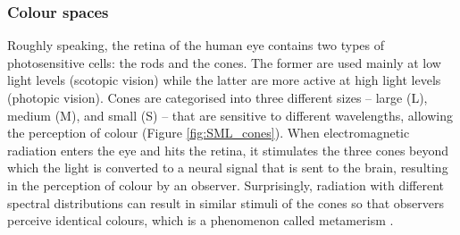 \subsubsection{Colour spaces}

Roughly speaking, the retina of the human eye contains two types of photosensitive cells: the rods and the cones. The former are used mainly at low light levels (scotopic vision) while the latter are more active at high light levels (photopic vision). Cones are categorised into three different sizes – large (L), medium (M), and small (S) – that are sensitive to different wavelengths, allowing the perception of colour (Figure \ref{fig:SML_cones}). When electromagnetic radiation enters the eye and hits the retina, it stimulates the three cones beyond which the light is converted to a neural signal that is sent to the brain, resulting in the perception of colour by an observer. Surprisingly, radiation with different spectral distributions can result in similar stimuli of the cones so that observers perceive identical colours, which is a phenomenon called metamerism \citep[Chapter 6]{hunt_measuring_2011}.\\



